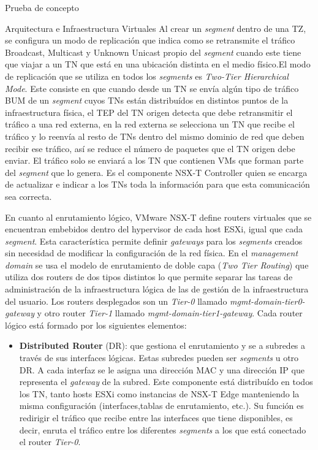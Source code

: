 \begin{section}{Prueba de concepto}
\begin{subsection}{Arquitectura e Infraestructura Virtuales\cite{CFVirtInfraes}}
Al crear un \textit{segment} dentro de una TZ, se configura un modo de replicación que indica como se retransmite el tráfico Broadcast, Multicast y Unknown Unicast propio del \textit{segment} cuando este tiene que viajar a un TN que está en una ubicación distinta en el medio físico.El modo de replicación que se utiliza en todos los \textit{segments} es \textit{Two-Tier Hierarchical Mode}. Este consiste en que cuando desde un TN se envía algún tipo de tráfico BUM de un \textit{segment} cuyos TNs están distribuídos en distintos puntos de la infraestructura física, el TEP del TN origen detecta que debe retransmitir el tráfico a una red externa, en la red externa se selecciona un TN que recibe el tráfico y lo reenvía al resto de TNs dentro del mismo dominio de red que deben recibir ese tráfico, así se reduce el número de paquetes que el TN origen debe enviar. El tráfico solo se enviará a los TN que contienen VMs que forman parte del \textit{segment} que lo genera. Es el componente NSX-T Controller quien se encarga de actualizar e indicar a los TNs toda la información para que esta comunicación sea correcta.

En cuanto al enrutamiento lógico, VMware NSX-T define routers virtuales que se encuentran embebidos dentro del hypervisor de cada host ESXi, igual que cada \textit{segment}. Esta característica permite definir \textit{gateways} para los \textit{segments} creados sin necesidad de modificar la configuración de la red física. En el \textit{management domain} se usa el modelo de enrutamiento de doble capa (\textit{Two Tier Routing}) que utiliza dos routers de dos tipos distintos lo que permite separar las tareas de administración de la infraestructura lógica de las de gestión de la infraestructura del usuario. Los routers desplegados son un \textit{Tier-0} llamado \textit{mgmt-domain-tier0-gateway} y otro router \textit{Tier-1} llamado \textit{mgmt-domain-tier1-gateway}. Cada router lógico está formado por los siguientes elementos:
\begin{itemize}
  
  \item \textbf{Distributed Router} (DR): que gestiona el enrutamiento y se a subredes a través de sus interfaces lógicas. Estas subredes pueden ser \textit{segments} u otro DR. A cada interfaz se le asigna una dirección MAC y una dirección IP que representa el \textit{gateway} de la subred. Este componente está distribuído en todos los TN, tanto hosts ESXi como instancias de NSX-T Edge manteniendo la misma configuración (interfaces,tablas de enrutamiento, etc.). Su función es redirigir el tráfico que recibe entre las interfaces que tiene disponibles, es decir, enruta el tráfico entre los diferentes \textit{segments} a los que está conectado el router \textit{Tier-0}.  
  

\end{itemize}
\end{subsection}
\end{section}
